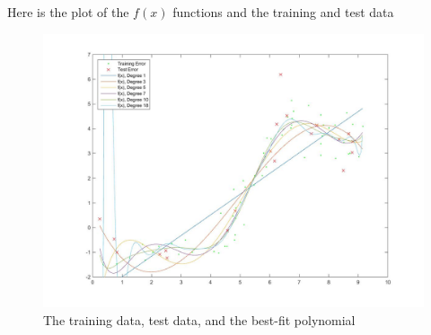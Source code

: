 \documentclass[twoside,11pt]{article}
\theoremstyle{definition}
\begin{document}

Here is the plot of the $f(x)$ functions and the training and test data
\begin{figure}[H]
\centering
\includegraphics[width=\columnwidth]{prob1cPlotA.jpg}
\caption{The training data, test data, and the best-fit polynomial}
\end{figure}
\end{document}
